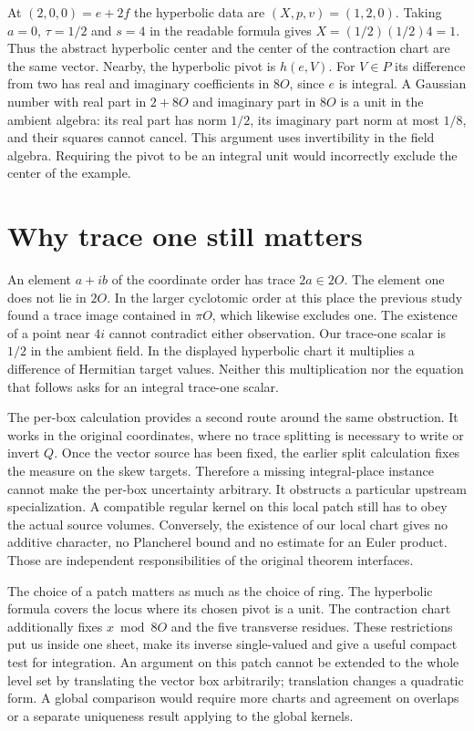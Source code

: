 \documentclass[12pt,letterpaper]{article}
\begin{document}
At $(2,0,0)=e+2f$ the hyperbolic data are $(X,p,v)=(1,2,0)$. Taking $a=0$, $\tau=1/2$ and $s=4$ in the readable formula gives $X=(1/2)(1/2)4=1$. Thus the abstract hyperbolic center and the center of the contraction chart are the same vector. Nearby, the hyperbolic pivot is $h(e,V)$. For $V\in P$ its difference from two has real and imaginary coefficients in $8O$, since $e$ is integral. A Gaussian number with real part in $2+8O$ and imaginary part in $8O$ is a unit in the ambient algebra: its real part has norm $1/2$, its imaginary part norm at most $1/8$, and their squares cannot cancel. This argument uses invertibility in the field algebra. Requiring the pivot to be an integral unit would incorrectly exclude the center of the example.

\section{Why trace one still matters}
An element $a+ib$ of the coordinate order has trace $2a\in2O$. The element one does not lie in $2O$. In the larger cyclotomic order at this place the previous study found a trace image contained in $\pi O$, which likewise excludes one. The existence of a point near $4i$ cannot contradict either observation. Our trace-one scalar is $1/2$ in the ambient field. In the displayed hyperbolic chart it multiplies a difference of Hermitian target values. Neither this multiplication nor the equation that follows asks for an integral trace-one scalar.

The per-box calculation provides a second route around the same obstruction. It works in the original coordinates, where no trace splitting is necessary to write or invert $Q$. Once the vector source has been fixed, the earlier split calculation fixes the measure on the skew targets. Therefore a missing integral-place instance cannot make the per-box uncertainty arbitrary. It obstructs a particular upstream specialization. A compatible regular kernel on this local patch still has to obey the actual source volumes. Conversely, the existence of our local chart gives no additive character, no Plancherel bound and no estimate for an Euler product. Those are independent responsibilities of the original theorem interfaces.

The choice of a patch matters as much as the choice of ring. The hyperbolic formula covers the locus where its chosen pivot is a unit. The contraction chart additionally fixes $x\bmod 8O$ and the five transverse residues. These restrictions put us inside one sheet, make its inverse single-valued and give a useful compact test for integration. An argument on this patch cannot be extended to the whole level set by translating the vector box arbitrarily; translation changes a quadratic form. A global comparison would require more charts and agreement on overlaps or a separate uniqueness result applying to the global kernels.
\end{document}
